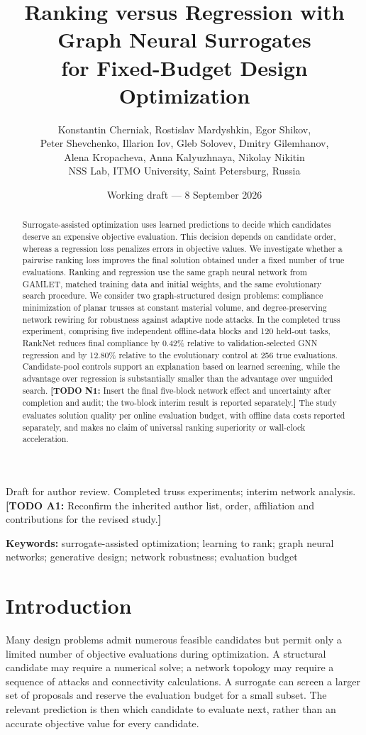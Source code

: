 \documentclass[11pt,a4paper]{article}
\title{Ranking versus Regression with Graph Neural Surrogates\protect\\for Fixed-Budget Design Optimization}
\author{\small Konstantin Cherniak, Rostislav Mardyshkin, Egor Shikov,\\
\small Peter Shevchenko, Illarion Iov, Gleb Solovev, Dmitry Gilemhanov,\\
\small Alena Kropacheva, Anna Kalyuzhnaya, Nikolay Nikitin\\[4pt]
\small NSS Lab, ITMO University, Saint Petersburg, Russia}
\date{Working draft --- 8 September 2026}
\newcommand{\todo}[2]{\textcolor{red!65!black}{\textbf{[TODO #1:} #2\textbf{]}}}
\begin{document}
\maketitle
\begin{center}\small
Draft for author review. Completed truss experiments; interim network analysis.\\
\todo{A1}{Reconfirm the inherited author list, order, affiliation and contributions for the revised study.}
\end{center}
\begin{abstract}
Surrogate-assisted optimization uses learned predictions to decide which candidates deserve an expensive objective evaluation. This decision depends on candidate order, whereas a regression loss penalizes errors in objective values. We investigate whether a pairwise ranking loss improves the final solution obtained under a fixed number of true evaluations. Ranking and regression use the same graph neural network from GAMLET, matched training data and initial weights, and the same evolutionary search procedure. We consider two graph-structured design problems: compliance minimization of planar trusses at constant material volume, and degree-preserving network rewiring for robustness against adaptive node attacks. In the completed truss experiment, comprising five independent offline-data blocks and 120 held-out tasks, RankNet reduces final compliance by 0.42\% relative to validation-selected GNN regression and by 12.80\% relative to the evolutionary control at 256 true evaluations. Candidate-pool controls support an explanation based on learned screening, while the advantage over regression is substantially smaller than the advantage over unguided search. \todo{N1}{Insert the final five-block network effect and uncertainty after completion and audit; the two-block interim result is reported separately.} The study evaluates solution quality per online evaluation budget, with offline data costs reported separately, and makes no claim of universal ranking superiority or wall-clock acceleration.
\end{abstract}
\noindent\textbf{Keywords:} surrogate-assisted optimization; learning to rank; graph neural networks; generative design; network robustness; evaluation budget

\section{Introduction}
Many design problems admit numerous feasible candidates but permit only a limited number of objective evaluations during optimization. A structural candidate may require a numerical solve; a network topology may require a sequence of attacks and connectivity calculations. A surrogate can screen a larger set of proposals and reserve the evaluation budget for a small subset. The relevant prediction is then which candidate to evaluate next, rather than an accurate objective value for every candidate.
\end{document}
